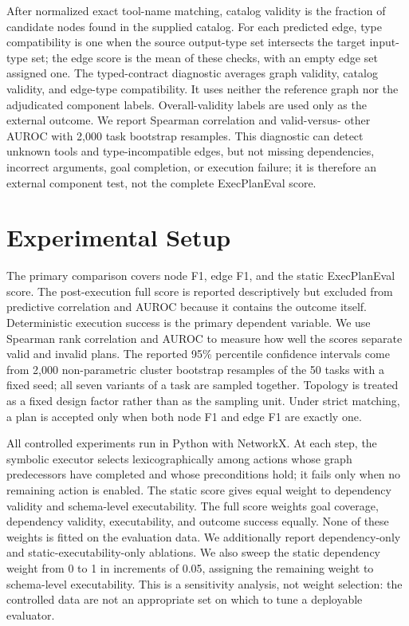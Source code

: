\documentclass[10pt]{article}
\begin{document}
After normalized exact tool-name matching, catalog validity is the fraction of
candidate nodes found in the supplied catalog. For each predicted edge, type
compatibility is one when the source output-type set intersects the target
input-type set; the edge score is the mean of these checks, with an empty edge
set assigned one. The typed-contract diagnostic averages graph validity,
catalog validity, and edge-type compatibility. It uses neither the reference
graph nor the adjudicated component labels. Overall-validity labels are used
only as the external outcome. We report Spearman correlation and valid-versus-
other AUROC with 2,000 task bootstrap resamples. This diagnostic can detect
unknown tools and type-incompatible edges, but not missing dependencies,
incorrect arguments, goal completion, or execution failure; it is therefore an
external component test, not the complete ExecPlanEval score.

\section{Experimental Setup}
The primary comparison covers node F1, edge F1, and the static ExecPlanEval
score. The post-execution full score is reported descriptively but excluded
from predictive correlation and AUROC because it contains the outcome itself.
Deterministic execution success is the primary dependent variable. We use
Spearman rank correlation and AUROC to
measure how well the scores separate valid and invalid plans. The reported
95\% percentile confidence intervals come from 2,000 non-parametric cluster
bootstrap resamples of the 50 tasks with a fixed seed; all seven variants of a
task are sampled together. Topology is treated as a fixed design factor rather
than as the sampling unit. Under strict matching, a plan is accepted only
when both node F1 and edge F1 are exactly one.

All controlled experiments run in Python with NetworkX. At each step, the
symbolic executor selects lexicographically among actions whose graph
predecessors have completed and whose preconditions hold; it fails only when no
remaining action is enabled. The static score gives equal weight to dependency
validity and schema-level executability. The full score weights goal coverage,
dependency validity, executability, and outcome success equally. None of these
weights is fitted on the evaluation data. We additionally report dependency-only
and static-executability-only ablations.
We also sweep the static dependency weight from 0 to 1 in increments of 0.05,
assigning the remaining weight to schema-level executability. This is a
sensitivity analysis, not weight selection: the controlled data are not an
appropriate set on which to tune a deployable evaluator.
\end{document}
